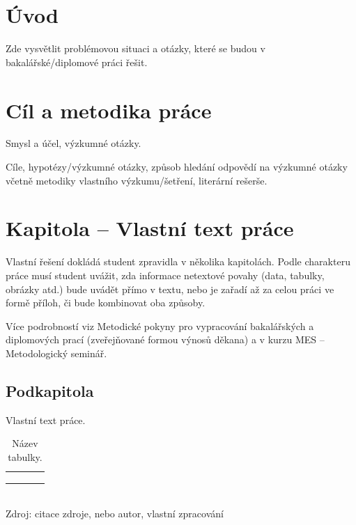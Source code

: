 \section{Úvod}

Zde vysvětlit problémovou situaci a otázky, které se budou v bakalářské/diplomové práci řešit.


\section{Cíl a metodika práce}

Smysl a účel, výzkumné otázky.  

Cíle, hypotézy/výzkumné otázky, způsob hledání odpovědí na výzkumné otázky včetně metodiky vlastního výzkumu/šetření, literární rešerše.


\section{Kapitola -- Vlastní text práce}

Vlastní řešení dokládá student zpravidla v několika kapitolách. Podle charakteru práce musí student uvážit, zda informace netextové povahy (data, tabulky, obrázky atd.) bude uvádět přímo v textu, nebo je zařadí až za celou práci ve formě příloh, či bude kombinovat oba způsoby. 

Více podrobností viz Metodické pokyny pro vypracování bakalářských a diplomových prací (zveřejňované formou výnosů děkana) a v kurzu MES -- Metodologický seminář. 

\subsection{Podkapitola}

Vlastní text práce.

\begin{table}[htb!]  
\caption{Název tabulky.}

\begin{tabular}{| l | l | l | l |}
\hline
 \hspace{0.22\textwidth} & \hspace{0.22\textwidth} & \hspace{0.22\textwidth} & \hspace{0.22\textwidth} \\
\hline
 & & & \\
\hline
 & & & \\
\hline
 & & & \\
\hline
\end{tabular} \\

Zdroj: citace zdroje, nebo autor, vlastní zpracování
\end{table}

